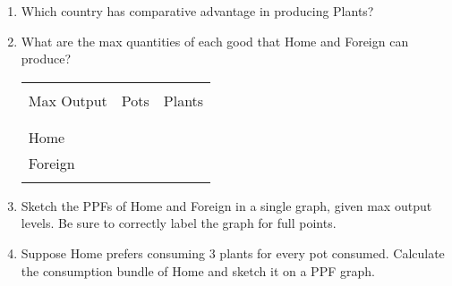 \documentclass[12pt]{article}
\begin{document}
\begin{enumerate}[1)]

\item Which country has comparative advantage in producing Plants?

\newpage

\item What are the max quantities of each good that Home and Foreign can produce?

\vspace{2.0in}

\begin{table}[!h]
	\centering
	\begin{tabular}[t]{l c c }
		\hline
		&&\\
		Max Output & Pots & Plants  \\
		&&\\
		\hline
		&&\\
		Home &  &   \\
		Foreign &  &  \\
		&&\\
		\hline
	\end{tabular}
\end{table}

\item Sketch the PPFs of Home and Foreign in a single graph, given max output levels. Be sure to correctly label the graph for full points. 

\bigskip

\bigskip

\bigskip

\bigskip

\newpage

\item Suppose Home prefers consuming 3 plants for every pot consumed. Calculate the consumption bundle of Home and sketch it on a PPF graph.

\bigskip

\bigskip

\bigskip

\bigskip

\bigskip

\bigskip

\bigskip

\bigskip

\bigskip

\bigskip

\bigskip

\bigskip

\bigskip

\bigskip


\end{enumerate}
\end{document}

